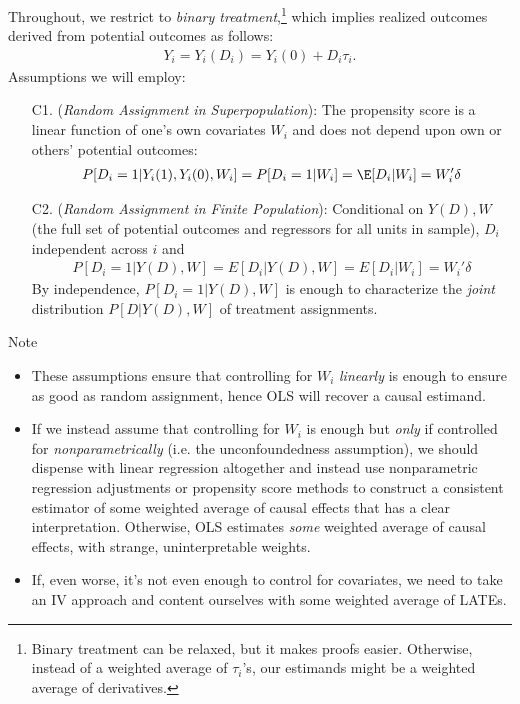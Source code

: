 \documentclass[12pt]{article}
\theoremstyle{plain}
\theoremstyle{definition}
\theoremstyle{remark}
\begin{document}
Throughout, we restrict to
\emph{binary treatment},\footnote{%
  Binary treatment can be relaxed, but it
  makes proofs easier.
  Otherwise, instead of a weighted average of $\tau_i$'s, our
  estimands might be a weighted average of derivatives.
}
which implies realized outcomes derived from potential outcomes as
follows:
\begin{align*}
  Y_i = Y_i(D_i)=Y_i(0)+D_i\tau_i
  .
\end{align*}
Assumptions we will employ:
\begin{enumerate}
  \item[C1.]
    (\emph{Random Assignment in Superpopulation}):
    The propensity score is a linear function of one's own covariates
    $W_i$ and does not depend upon own or others' potential outcomes:
    \begin{align*}
      P[D_i=1|Y_i(1),Y_i(0),W_i]
      =
      P[D_i=1|W_i]
      =
      \E[D_i|W_i]
      =W_i'\delta
    \end{align*}
  \item[C2.]
    (\emph{Random Assignment in Finite Population}):
    Conditional on $Y(D),W$ (the full set of potential outcomes and
    regressors for all units in sample), $D_i$ independent across
    $i$ and
    \begin{align*}
      P[D_i=1|Y(D),W]
      =E[D_i|Y(D),W]
      =E[D_i|W_i]
      =W_i'\delta
    \end{align*}
    By independence, $P[D_i=1|Y(D),W]$ is enough to characterize the
    \emph{joint} distribution $P[D|Y(D),W]$ of treatment assignments.
\end{enumerate}
Note
\begin{itemize}
  \item
    These assumptions ensure that controlling for $W_i$ \emph{linearly}
    is enough to ensure as good as random assignment, hence OLS will
    recover a causal estimand.
  \item
    If we instead assume that controlling for $W_i$
    is enough but \emph{only} if controlled for
    \emph{nonparametrically} (i.e. the unconfoundedness assumption),
    we should dispense with linear regression altogether and
    instead use nonparametric regression adjustments or propensity
    score methods to construct a consistent estimator of some weighted
    average of causal effects that has a clear interpretation.
    Otherwise, OLS estimates \emph{some} weighted average of causal
    effects, with strange, uninterpretable weights.
  \item
    If, even worse, it's not even enough to control for covariates, we
    need to take an IV approach and content ourselves with some
    weighted average of LATEs.
\end{itemize}
\end{document}

